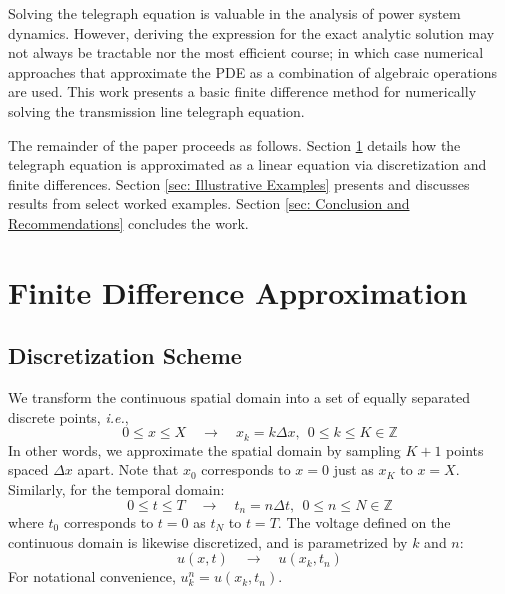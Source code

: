 \documentclass{article}
\begin{document}
Solving the telegraph equation is valuable in the analysis of power system dynamics.
However, deriving the expression for the exact analytic solution may not always be tractable nor the most efficient course;
in which case numerical approaches that approximate the PDE as a combination of algebraic operations are used.
This work presents a basic finite difference method for numerically solving the transmission line telegraph equation.

The remainder of the paper proceeds as follows.
Section \ref{sec: Finite Difference Approximation} details how the telegraph equation is approximated as a linear equation via discretization and finite differences.
Section \ref{sec: Illustrative Examples} presents and discusses results from select worked examples.
Section \ref{sec: Conclusion and Recommendations} concludes the work.

\section{Finite Difference Approximation}
\label{sec: Finite Difference Approximation}

\subsection{Discretization Scheme}
\label{subsec: Discretization Scheme}

We transform the continuous spatial domain into a set of equally separated discrete points, \textit{i.e.},
\begin{equation*}
   0 \leq x \leq X \quad
   \longrightarrow \quad
   x_{k} = k \Delta x,\ \ 0 \leq k \leq K \in \mathbb{Z}
\end{equation*}
In other words, we approximate the spatial domain by sampling $K+1$ points spaced $\Delta x$ apart.
Note that $x_{0}$ corresponds to $x=0$ just as $x_{K}$ to $x=X$.
Similarly, for the temporal domain:
\begin{equation*}
   0 \leq t \leq T \quad
   \longrightarrow \quad
   t_{n} = n \Delta t,\ \ 0 \leq n \leq N \in \mathbb{Z}
\end{equation*}
where $t_0$ corresponds to $t=0$ as $t_{N}$ to $t=T$.
The voltage defined on the continuous domain is likewise discretized,
and is parametrized by $k$ and $n$:
\begin{equation*}
   u \left(x,t\right) \quad
   \longrightarrow \quad
   u \left(x_{k},t_{n}\right)
\end{equation*}
For notational convenience, $u_{k}^{n} = u \left(x_{k},t_{n}\right)$.
\end{document}
